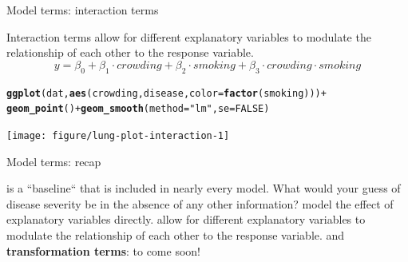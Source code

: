 \documentclass[table]{beamer}\usepackage[]{graphicx}\usepackage[]{color}
\makeatletter
\newcommand{\hlnum}[1]{\textcolor[rgb]{0.686,0.059,0.569}{#1}}%
\newcommand{\hlstr}[1]{\textcolor[rgb]{0.192,0.494,0.8}{#1}}%
\newcommand{\hlopt}[1]{\textcolor[rgb]{0,0,0}{#1}}%
\newcommand{\hlstd}[1]{\textcolor[rgb]{0.345,0.345,0.345}{#1}}%
\newcommand{\hlkwc}[1]{\textcolor[rgb]{0.333,0.667,0.333}{#1}}%
\newcommand{\hlkwd}[1]{\textcolor[rgb]{0.737,0.353,0.396}{\textbf{#1}}}%
\newenvironment{kframe}{%
 \def\at@end@of@kframe{}%
 \ifinner\ifhmode%
  \def\at@end@of@kframe{\end{minipage}}%
  \begin{minipage}{\columnwidth}%
 \fi\fi%
 \def\FrameCommand##1{\hskip\@totalleftmargin \hskip-\fboxsep
 \colorbox{shadecolor}{##1}\hskip-\fboxsep
     \hskip-\linewidth \hskip-\@totalleftmargin \hskip\columnwidth}%
 \MakeFramed {\advance\hsize-\width
   \@totalleftmargin\z@ \linewidth\hsize
   \@setminipage}}%
 {\par\unskip\endMakeFramed%
 \at@end@of@kframe}
\newenvironment{knitrout}{}{} %
\makeatother
\begin{document}
\begin{frame}[fragile]{Model terms: interaction terms}

Interaction terms allow for different explanatory variables to modulate the relationship of each other to the response variable. $$y = \beta_0 + \beta_1 \cdot crowding + \beta_2 \cdot smoking + \beta_3 \cdot crowding \cdot smoking$$

\begin{knitrout}\footnotesize
{}\color{fgcolor}\begin{kframe}
\begin{alltt}
\hlkwd{ggplot}\hlstd{(dat,} \hlkwd{aes}\hlstd{(crowding, disease,} \hlkwc{color}\hlstd{=}\hlkwd{factor}\hlstd{(smoking)))} \hlopt{+}
  \hlkwd{geom_point}\hlstd{()} \hlopt{+} \hlkwd{geom_smooth}\hlstd{(}\hlkwc{method}\hlstd{=}\hlstr{"lm"}\hlstd{,} \hlkwc{se}\hlstd{=}\hlnum{FALSE}\hlstd{)}
\end{alltt}
\end{kframe}
\texttt{[image: figure/lung-plot-interaction-1]} 

\end{knitrout}

\end{frame}



\begin{frame}[fragile]{Model terms: recap}

\bi
   is a ``baseline`` that is included in nearly every model. What would your guess of disease severity be in the absence of any other information?
   model the effect of explanatory variables directly.
   allow for different explanatory variables to modulate the relationship of each other to the response variable.
   and {\bf transformation terms}: to come soon!
\ei

\end{frame}
\end{document}
